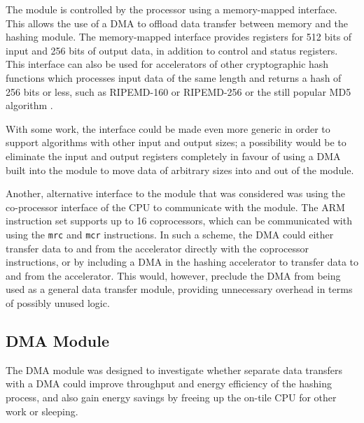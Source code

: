 The module is controlled by the processor using a memory-mapped interface. This allows the use
of a DMA to offload data transfer between memory and the hashing module. The memory-mapped interface
provides registers for 512 bits of input and 256 bits of output data, in addition to control and
status registers. This interface can also be used for accelerators of other cryptographic hash
functions which processes input data of the same length and returns a hash of 256 bits or less,
such as RIPEMD-160 or RIPEMD-256 \cite{ripemd} or the still popular MD5 algorithm \cite{md5}.

With some work, the interface could be made even more generic in order to support algorithms
with other input and output sizes; a possibility would be to eliminate the input and output
registers completely in favour of using a DMA built into the module to move data of arbitrary
sizes into and out of the module.

Another, alternative interface to the module that was considered was using the co-processor interface
of the CPU to communicate with the module. The ARM instruction set supports up to 16 coprocessors,
which can be communicated with using the \texttt{mrc} and \texttt{mcr} instructions. In such a scheme,
the DMA could either transfer data to and from the accelerator directly with the coprocessor instructions,
or by including a DMA in the hashing accelerator to transfer data to and from the accelerator. This would,
however, preclude the DMA from being used as a general data transfer module, providing unnecessary
overhead in terms of possibly unused logic.



\subsection{DMA Module}

The DMA module was designed to investigate whether separate data transfers with a DMA could improve throughput and energy efficiency of the hashing process, and also gain energy savings by freeing up the on-tile CPU for other work or sleeping.

